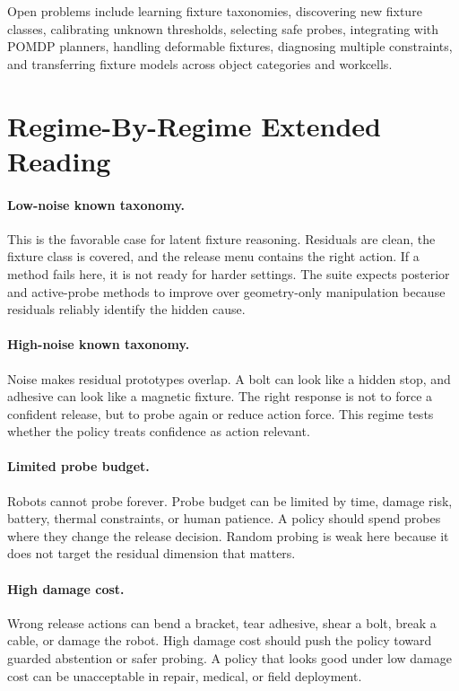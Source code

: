 \documentclass{article}
\begin{document}
Open problems include learning fixture taxonomies, discovering new fixture
classes, calibrating unknown thresholds, selecting safe probes, integrating
with POMDP planners, handling deformable fixtures, diagnosing multiple
constraints, and transferring fixture models across object categories and
workcells.

\section{Regime-By-Regime Extended Reading}

\paragraph{Low-noise known taxonomy.}
This is the favorable case for latent fixture reasoning. Residuals are clean,
the fixture class is covered, and the release menu contains the right action.
If a method fails here, it is not ready for harder settings. The suite expects
posterior and active-probe methods to improve over geometry-only manipulation
because residuals reliably identify the hidden cause.

\paragraph{High-noise known taxonomy.}
Noise makes residual prototypes overlap. A bolt can look like a hidden stop,
and adhesive can look like a magnetic fixture. The right response is not to
force a confident release, but to probe again or reduce action force. This
regime tests whether the policy treats confidence as action relevant.

\paragraph{Limited probe budget.}
Robots cannot probe forever. Probe budget can be limited by time, damage risk,
battery, thermal constraints, or human patience. A policy should spend probes
where they change the release decision. Random probing is weak here because it
does not target the residual dimension that matters.

\paragraph{High damage cost.}
Wrong release actions can bend a bracket, tear adhesive, shear a bolt, break a
cable, or damage the robot. High damage cost should push the policy toward
guarded abstention or safer probing. A policy that looks good under low damage
cost can be unacceptable in repair, medical, or field deployment.
\end{document}
